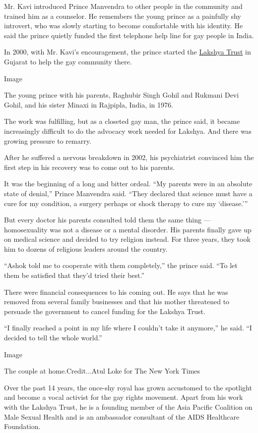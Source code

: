 Mr. Kavi introduced Prince Manvendra to other people in the community
and trained him as a counselor. He remembers the young prince as a
painfully shy introvert, who was slowly starting to become comfortable
with his identity. He said the prince quietly funded the first telephone
help line for gay people in India.

In 2000, with Mr. Kavi's encouragement, the prince started the
\href{https://www.lakshyatrust.com/}{Lakshya Trust} in Gujarat to help
the gay community there.

Image

The young prince with his parents, Raghubir Singh Gohil and Rukmani Devi
Gohil, and his sister Minaxi in Rajpipla, India, in 1976.

The work was fulfilling, but as a closeted gay man, the prince said, it
became increasingly difficult to do the advocacy work needed for
Lakshya. And there was growing pressure to remarry.

After he suffered a nervous breakdown in 2002, his psychiatrist
convinced him the first step in his recovery was to come out to his
parents.

It was the beginning of a long and bitter ordeal. ``My parents were in
an absolute state of denial,'' Prince Manvendra said. ``They declared
that science must have a cure for my condition, a surgery perhaps or
shock therapy to cure my `disease.'''

But every doctor his parents consulted told them the same thing ---
homosexuality was not a disease or a mental disorder. His parents
finally gave up on medical science and decided to try religion instead.
For three years, they took him to dozens of religious leaders around the
country.

``Ashok told me to cooperate with them completely,'' the prince said.
``To let them be satisfied that they'd tried their best.''

There were financial consequences to his coming out. He says that he was
removed from several family businesses and that his mother threatened to
persuade the government to cancel funding for the Lakshya Trust.

``I finally reached a point in my life where I couldn't take it
anymore,'' he said. ``I decided to tell the whole world.''

Image

The couple at home.Credit...Atul Loke for The New York Times

Over the past 14 years, the once-shy royal has grown accustomed to the
spotlight and become a vocal activist for the gay rights movement. Apart
from his work with the Lakshya Trust, he is a founding member of the
Asia Pacific Coalition on Male Sexual Health and is an ambassador
consultant of the AIDS Healthcare Foundation.

